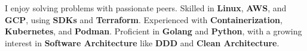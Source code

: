 

%
\begin{cventries}

  \cventry
  {}
  {}
  {}
  {}
  {I enjoy solving problems with passionate peers. Skilled in \textbf{Linux}, \textbf{AWS}, and \textbf{GCP}, using \textbf{SDKs} and \textbf{Terraform}. Experienced with \textbf{Containerization}, \textbf{Kubernetes}, and \textbf{Podman}. Proficient in \textbf{Golang} and \textbf{Python}, with a growing interest in \textbf{Software Architecture} like \textbf{DDD} and \textbf{Clean Architecture}.}
  \vspace{0.5em}
\end{cventries}
